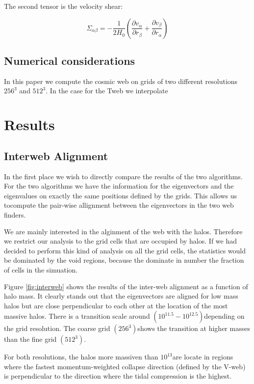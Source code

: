 \documentclass[usenatbib]{mn2e}
\newcommand{\hMsun}{{\ifmmode{h^{-1}{\rm
        {M_{\odot}}}}\else{$h^{-1}{\rm{M_{\odot}}}$}\fi}}
\begin{document}
The second tensor is the velocity shear:

\begin{equation}
\Sigma_{\alpha\beta} = -\frac{1}{2H_{0}}\left(\frac{\partial
  v_{\alpha}}{\partial r_{\beta}}+ \frac{\partial v_{\beta}}{\partial
  r_{\alpha}}\right) 
\end{equation}

\subsection{Numerical considerations}

In this paper we compute the cosmic web on grids of two different
resolutions $256^3$ and $512^3$. In the case for the Tweb we interpolate



\section{Results}

\subsection{Interweb Alignment}

In the first place we wish to directly compare the results of the two
algorithms. For the two algorithms we have the information for the
eigenvectors and the eigenvalues on exactly the same positions defined
by the grids. This allows us tocompute the pair-wise allignment
between the eigenvectors in the two web finders. 

We are mainly interested in the alginment of the web with
the halos. Therefore we restrict our analysis to the grid cells that are
occupied by halos. If we had decided to perform this kind of analysis
on all the grid cells, the statistics would be dominated by the void
regions, because the dominate in number the fraction of cells in the
simuation.

Figure \ref{fig:interweb} shows the results of the inter-web alignment
as a function of halo mass. It clearly stands out that the
eigenvectors are aligned for low mass halos but are close perpendicular to
each other at the location of the most massive halos. There is a
transition scale around $(10^{11.5}-10^{12.5})$\hMsun depending on the
grid resolution. The coarse grid $(256^3)$shows the transition at higher masses
than the fine grid $(512^3)$.  


For both resolutions, the halos more massiven than $10^{13}$\hMsun are
locate in regions where the fastest momentum-weighted collapse
direction (defined by the V-web) is perpendicular to the direction
where the tidal compression is the highest. 
\end{document}
